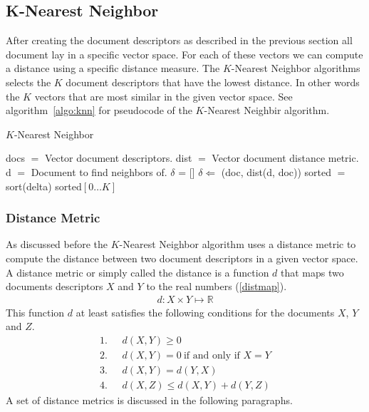 \subsection{K-Nearest Neighbor}
After creating the document descriptors as described in the previous section
all document lay in a specific vector space. For each of these vectors we
can compute a distance using a specific distance measure. The $K$-Nearest
Neighbor algorithms selects the $K$ document descriptors that have the lowest
distance. In other words the $K$ vectors that are most similar in the given
vector space. See algorithm~\ref{algo:knn} for pseudocode of the $K$-Nearest
Neighbir algorithm.

\begin{algorithm}                      
  \caption{$K$-Nearest Neighbor}      
  \label{algo:knn}
  \begin{algorithmic}

    \STATE docs $=$ Vector document descriptors.
    \STATE dist $=$ Vector document distance metric.
    \STATE d $=$ Document to find neighbors of.
    \STATE $\delta$ = []
      \STATE $\delta \Leftarrow$ (doc, dist(d, doc))
    \ENDFOR
    \STATE sorted $=$ sort(delta)
    \RETURN sorted$[0\ldots K]$
  \end{algorithmic}
\end{algorithm}

\subsubsection{Distance Metric}
\label{sec:metrics}
As discussed before the $K$-Nearest Neighbor algorithm uses a distance metric
to compute the distance between two document descriptors in a given vector
space. A distance metric or simply called the distance is a function $d$ that 
maps two documents descriptors $X$ and $Y$ to the real numbers (\ref{distmap}).
\begin{align}
  d : X \times Y \mapsto \mathbb{R} \label{distmap}
\end{align}
This function $d$ at least satisfies the following conditions for the documents
$X$, $Y$ and $Z$.
\begin{align*}
  1.\ \ \ & d(X,Y) \geq 0 \\
  2.\ \ \ & d(X,Y) = 0\  \text{if and only if $X=Y$} \\
  3.\ \ \ & d(X,Y) = d(Y,X) \\
  4.\ \ \ & d(X,Z) \leq d(X,Y) + d(Y,Z)
\end{align*}
A set of distance metrics is discussed in the following paragraphs. 


